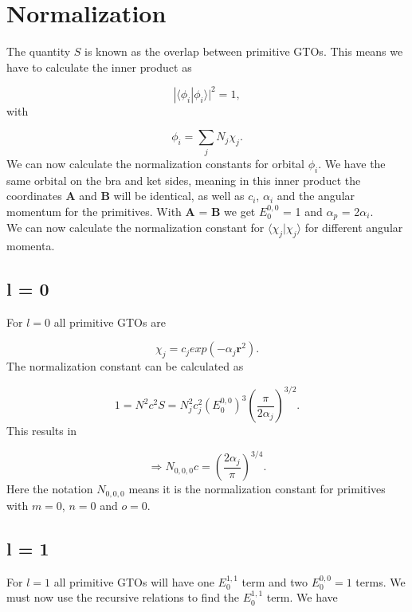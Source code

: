 \documentclass[a4paper,norsk,11pt,twoside]{report}
\begin{document}
\section{Normalization \label{normalization_section}}
The quantity $S$ is known as the overlap between primitive
GTOs. This means we have to  calculate the inner product
as

\begin{equation}
|\langle \phi_i | \phi_i \rangle |^2 = 1  ,
\end{equation}
with

\begin{equation}
\phi_i = \sum_j N_j \chi_j  .
\end{equation}
We can now calculate the normalization constants for orbital
$\phi_i$. We have the same orbital on the bra and ket sides, meaning in
this inner product the coordinates $\textbf{A}$ and $\textbf{B}$ will be
identical, as well as $c_i$, $\alpha_i$ and the angular momentum for the
primitives. With $\textbf{A}$ = $\textbf{B}$ we get $E_0^{0,0}$ = 1
and $\alpha_p$ = 2$\alpha_i$. \\

We can now calculate the normalization constant for $\langle \chi_j|\chi_j \rangle$ for different angular momenta.

\subsection{l = 0}
For $l = 0$ all primitive GTOs are 

\begin{equation}
\chi_j = c_j exp(-\alpha_j \textbf{r}^2) . 
\end{equation} 
The normalization constant can be calculated as 

\begin{equation}
1 = N^2 c^2 S = N_j^2 c_j^2 \left(E_0^{0,0}\right)^3 \left(\frac{\pi}{2\alpha_j}\right)^{3/2} .
\end{equation}
This results in

\begin{equation}
\Rightarrow N_{0,0,0} c = \left( \frac{2\alpha_j}{\pi} \right)^{3/4} .
\end{equation}
Here the notation $N_{0,0,0}$ means it is the normalization constant for primitives with $m=0$, $n=0$ and $o=0$.

\subsection{l = 1}
For $l = 1$ all primitive GTOs will have one $E_0^{1,1}$ term and two
$E_0^{0,0} = 1$ terms. We must now use the recursive relations to find
the $E_0^{1,1}$ term. We have
\end{document}
